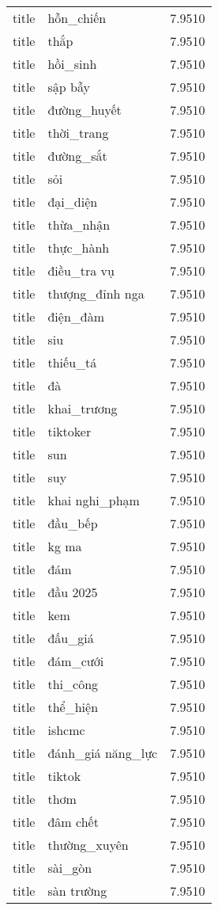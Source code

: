 \documentclass{article}
\begin{document}
\begin{tabular}{lll}
title & hỗn\_chiến & 7.9510\\
title & thắp & 7.9510\\
title & hồi\_sinh & 7.9510\\
title & sập bẫy & 7.9510\\
title & đường\_huyết & 7.9510\\
title & thời\_trang & 7.9510\\
title & đường\_sắt & 7.9510\\
title & sỏi & 7.9510\\
title & đại\_diện & 7.9510\\
title & thừa\_nhận & 7.9510\\
title & thực\_hành & 7.9510\\
title & điều\_tra vụ & 7.9510\\
title & thượng\_đỉnh nga & 7.9510\\
title & điện\_đàm & 7.9510\\
title & siu & 7.9510\\
title & thiếu\_tá & 7.9510\\
title & đà & 7.9510\\
title & khai\_trương & 7.9510\\
title & tiktoker & 7.9510\\
title & sun & 7.9510\\
title & suy & 7.9510\\
title & khai nghi\_phạm & 7.9510\\
title & đầu\_bếp & 7.9510\\
title & kg ma & 7.9510\\
title & đám & 7.9510\\
title & đầu 2025 & 7.9510\\
title & kem & 7.9510\\
title & đấu\_giá & 7.9510\\
title & đám\_cưới & 7.9510\\
title & thi\_công & 7.9510\\
title & thể\_hiện & 7.9510\\
title & ishcmc & 7.9510\\
title & đánh\_giá năng\_lực & 7.9510\\
title & tiktok & 7.9510\\
title & thơm & 7.9510\\
title & đâm chết & 7.9510\\
title & thường\_xuyên & 7.9510\\
title & sài\_gòn & 7.9510\\
title & sàn trường & 7.9510\\

\end{tabular}
\end{document}
